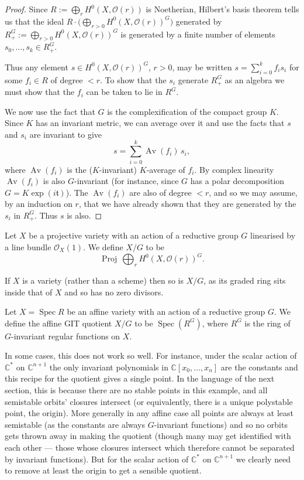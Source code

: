 \documentclass[12pt]{article}
\begin{document}
\begin{proof}
Since $R := \bigoplus_r H^0(X,\mathcal{O}(r))$ is Noetherian, Hilbert’s basis theorem tells 
us that the ideal $R\cdot \big(\bigoplus_{r>0} H^0(X,\mathcal{O}(r))^G\big)$ generated by 
$R^G_{+} := \bigoplus_{r>0} H^0(X,\mathcal{O}(r))^G$ is generated by a finite number of 
elements $s_0,\ldots,s_k \in R^G_{+}$.

Thus any element $s \in H^0(X,\mathcal{O}(r))^G$, $r>0$, may be written 
$s = \sum_{i=0}^k f_i s_i$ for some $f_i \in R$ of degree $<r$. To show that the $s_i$ 
generate $R^G_{+}$ as an algebra we must show that the $f_i$ can be taken to lie in $R^G$.

We now use the fact that $G$ is the complexification of the compact group $K$. Since 
$K$ has an invariant metric, we can average over it and use the facts that $s$ and $s_i$ 
are invariant to give
\[
s = \sum_{i=0}^k \operatorname{Av}(f_i)\, s_i,
\]
where $\operatorname{Av}(f_i)$ is the ($K$-invariant) $K$-average of $f_i$. By complex 
linearity $\operatorname{Av}(f_i)$ is also $G$-invariant (for instance, since $G$ has a 
polar decomposition $G = K \exp(i\mathfrak{t})$). The $\operatorname{Av}(f_i)$ are also of 
degree $<r$, and so we may assume, by an induction on $r$, that we have already shown that 
they are generated by the $s_i$ in $R^G_{+}$. Thus $s$ is also.
\end{proof}

\begin{definition}
Let $X$ be a projective variety with an action of a reductive group $G$ linearised by a line bundle $\mathcal{O}_X(1)$. We define $X/G$ to be 
\[
\operatorname{Proj}\, \bigoplus_r H^0(X,\mathcal{O}(r))^G.
\]
\end{definition}
If $X$ is a variety (rather than a scheme) then so is $X/G$, as its graded ring sits inside 
that of $X$ and so has no zero divisors. 

\begin{definition}
Let $X = \operatorname{Spec} R$ be an affine variety with an action of a reductive group $G$. We define the affine GIT quotient $X/G$ to be $\operatorname{Spec}(R^G)$, where $R^G$ is the ring of $G$-invariant regular functions on $X$.
\end{definition}
In some cases, this does not work so well. For instance, under the scalar action of 
$\mathbb{C}^*$ on $\mathbb{C}^{n+1}$ the only invariant polynomials in 
$\mathbb{C}[x_0,\dots,x_n]$ are the constants and this recipe for the quotient gives a 
single point. In the language of the next section, this is because there are no stable 
points in this example, and all semistable orbits’ closures intersect (or equivalently, 
there is a unique polystable point, the origin). More generally in any affine case all 
points are always at least semistable (as the constants are always $G$-invariant functions) 
and so no orbits gets thrown away in making the quotient (though many may get identified 
with each other — those whose closures intersect which therefore cannot be separated 
by invariant functions). But for the scalar action of $\mathbb{C}^*$ on $\mathbb{C}^{n+1}$ 
we clearly need to remove at least the origin to get a sensible quotient.
\end{document}
